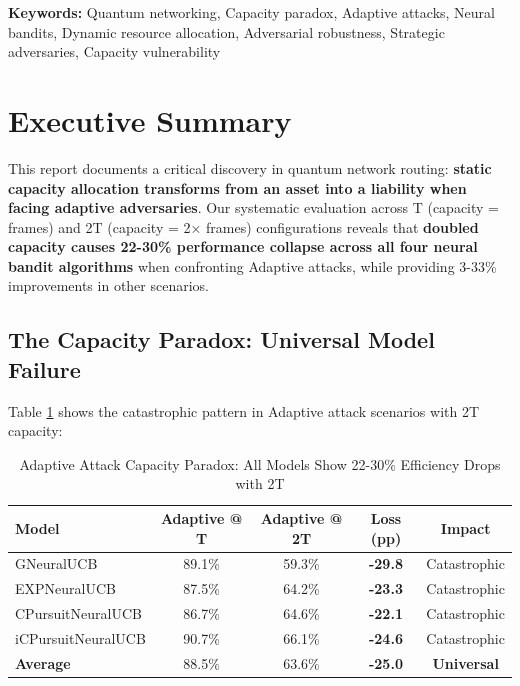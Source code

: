 \documentclass[11pt,a4paper]{article}
\newcommand{\performance}[1]{\textcolor{performancecolor}{\textbf{#1}}}
\newcommand{\critical}[1]{\textcolor{criticalcolor}{\textbf{#1}}}
\begin{document}
\vspace{0.3cm}
\noindent\textbf{Keywords:} Quantum networking, Capacity paradox, Adaptive attacks, Neural bandits, Dynamic resource allocation, Adversarial robustness, Strategic adversaries, Capacity vulnerability

\newpage

{\small\tableofcontents}
\newpage

\section{Executive Summary}

This report documents a critical discovery in quantum network routing: \performance{static capacity allocation transforms from an asset into a liability when facing adaptive adversaries}. Our systematic evaluation across T (capacity = frames) and 2T (capacity = 2× frames) configurations reveals that \critical{doubled capacity causes 22-30\% performance collapse across all four neural bandit algorithms} when confronting Adaptive attacks, while providing 3-33\% improvements in other scenarios.

\subsection{The Capacity Paradox: Universal Model Failure}

Table \ref{tab:adaptive_collapse} shows the catastrophic pattern in Adaptive attack scenarios with 2T capacity:

\vspace{-0.4cm}
\begin{table}[h]
\scriptsize
\centering
\begin{tabular}{lcccc}
\toprule
\textbf{Model} & \textbf{Adaptive @ T} & \textbf{Adaptive @ 2T} & \textbf{Loss (pp)} & \textbf{Impact} \\
\midrule
GNeuralUCB & 89.1\% & 59.3\% & \critical{-29.8} & Catastrophic \\
EXPNeuralUCB & 87.5\% & 64.2\% & \critical{-23.3} & Catastrophic \\
CPursuitNeuralUCB & 86.7\% & 64.6\% & \critical{-22.1} & Catastrophic \\
iCPursuitNeuralUCB & 90.7\% & 66.1\% & \critical{-24.6} & Catastrophic \\
\midrule
\textbf{Average} & 88.5\% & 63.6\% & \critical{-25.0} & \critical{Universal} \\
\bottomrule
\end{tabular}
\vspace{-0.2cm}
\caption{Adaptive Attack Capacity Paradox: All Models Show 22-30\% Efficiency Drops with 2T}
\label{tab:adaptive_collapse}
\end{table}
\end{document}

